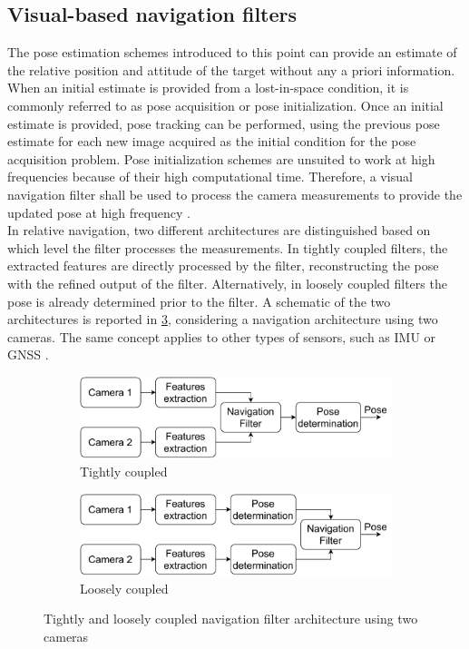 \subsection{Visual-based navigation filters}
\label{sec:visfilter}
The pose estimation schemes introduced to this point can provide an estimate of the relative position and attitude of the target without any a priori information. When an initial estimate is provided from a lost-in-space condition, it is commonly referred to as pose acquisition or pose initialization. Once an initial estimate is provided, pose tracking can be performed, using the previous pose estimate for each new image acquired as the initial condition for the pose acquisition problem. Pose initialization schemes are unsuited to work at high frequencies because of their high computational time. Therefore, a visual navigation filter shall be used to process the camera measurements to provide the updated pose at high frequency \cite{cassinis2019review}.\\
In relative navigation, two different architectures are distinguished based on which level the filter processes the measurements. In tightly coupled filters, the extracted features are directly processed by the filter, reconstructing the pose with the refined output of the filter. Alternatively, in loosely coupled filters the pose is already determined prior to the filter. A schematic of the two architectures is reported in \cref{fig:filtersheme}, considering a navigation architecture using two cameras. The same concept applies to other types of sensors, such as IMU or GNSS \cite{lee2022tightly}. 

\begin{figure}[!h]
     \centering
     \begin{subfigure}[b]{0.48\textwidth}
         \centering
         \includegraphics[width=\textwidth]{Images/tight.pdf}
         \caption{Tightly coupled}
         \label{fig:tightc}
     \end{subfigure}
     \hfill
     \begin{subfigure}[b]{0.48\textwidth}
         \centering
         \includegraphics[width=\textwidth]{Images/loose.pdf}
         \caption{Loosely coupled}
         \label{fig:loosec}
     \end{subfigure}
        \caption[Tightly and loosely coupled filters]{Tightly and loosely coupled navigation filter architecture using two cameras}
        \label{fig:filtersheme}
\end{figure}

